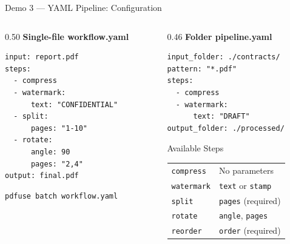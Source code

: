 \documentclass[aspectratio=169]{beamer}
\begin{document}
\begin{frame}[fragile]{Demo 3 --- YAML Pipeline: Configuration}
  \begin{columns}[T]
    \begin{column}{0.50\textwidth}
      \textbf{Single-file workflow.yaml}
      \begin{lstlisting}[language={}]
input: report.pdf
steps:
  - compress
  - watermark:
      text: "CONFIDENTIAL"
  - split:
      pages: "1-10"
  - rotate:
      angle: 90
      pages: "2,4"
output: final.pdf
      \end{lstlisting}
      \begin{lstlisting}
pdfuse batch workflow.yaml
      \end{lstlisting}
    \end{column}
    \begin{column}{0.46\textwidth}
      \textbf{Folder pipeline.yaml}
      \begin{lstlisting}[language={}]
input_folder: ./contracts/
pattern: "*.pdf"
steps:
  - compress
  - watermark:
      text: "DRAFT"
output_folder: ./processed/
      \end{lstlisting}
      \vspace{3pt}
      \begin{block}{Available Steps}
        \small
        \renewcommand{\arraystretch}{1.1}
        \begin{tabular}{ll}
          \texttt{compress}   & No parameters \\
          \texttt{watermark}  & \texttt{text} or \texttt{stamp} \\
          \texttt{split}      & \texttt{pages} (required) \\
          \texttt{rotate}     & \texttt{angle}, \texttt{pages} \\
          \texttt{reorder}    & \texttt{order} (required) \\
        \end{tabular}
      \end{block}
    \end{column}
  \end{columns}
\end{frame}
\end{document}
